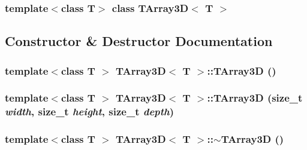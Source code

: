 \subsubsection*{template$<$class T$>$ class TArray3D$<$ T $>$}



\subsection{Constructor \& Destructor Documentation}
\hypertarget{classTArray3D_aa873df8def017abd44f790af8da75093}{
\subsubsection[{TArray3D}]{\setlength{\rightskip}{0pt plus 5cm}template$<$class T $>$ {\bf TArray3D}$<$ T $>$::{\bf TArray3D} ()}}
\label{classTArray3D_aa873df8def017abd44f790af8da75093}
\hypertarget{classTArray3D_a7ac940512cc13a03f59db36304f9a9d9}{
\subsubsection[{TArray3D}]{\setlength{\rightskip}{0pt plus 5cm}template$<$class T $>$ {\bf TArray3D}$<$ T $>$::{\bf TArray3D} (size\_\-t {\em width}, \/  size\_\-t {\em height}, \/  size\_\-t {\em depth})}}
\label{classTArray3D_a7ac940512cc13a03f59db36304f9a9d9}
\hypertarget{classTArray3D_aab64cc8e256350e80f20366f0388c9f1}{
\subsubsection[{$\sim$TArray3D}]{\setlength{\rightskip}{0pt plus 5cm}template$<$class T $>$ {\bf TArray3D}$<$ T $>$::$\sim${\bf TArray3D} ()}}
\label{classTArray3D_aab64cc8e256350e80f20366f0388c9f1}


